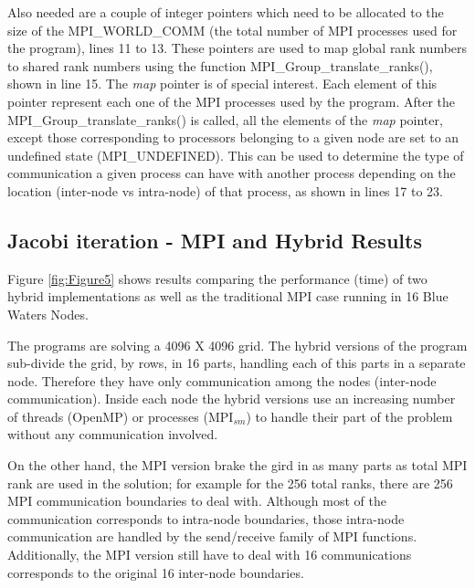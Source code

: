 Also needed are a couple of integer pointers which need to be allocated to the size of the MPI\_WORLD\_COMM (the total number of MPI processes used for the program), lines 11 to 13. These pointers are used to map global rank numbers to shared rank numbers using the function MPI\_Group\_translate\_ranks(), shown in line 15. The \emph{map} pointer is of special interest. Each element of this pointer represent each one of the MPI processes used by the program. After the MPI\_Group\_translate\_ranks() is called, all the elements of the \emph{map} pointer, except those corresponding to processors belonging to a given node are set to an undefined state (MPI\_UNDEFINED). This can be used to determine the type of communication a given process can have with another process depending on the location (inter-node vs intra-node) of that process, as shown in lines 17 to 23.


\subsection*{Jacobi iteration - MPI and Hybrid Results}



Figure \ref{fig:Figure5} shows results comparing the performance (time) of two hybrid implementations as well as the traditional MPI case running in 16 Blue Waters Nodes. 



The programs are solving a 4096 X 4096 grid. The hybrid versions of the program sub-divide the grid, by rows, in 16 parts, handling each of this parts in a separate node. Therefore they have only communication among the nodes (inter-node communication). Inside each node the hybrid versions use an increasing number of threads (OpenMP) or processes (MPI$_{sm}$) to handle their part of the problem without any communication involved.

On the other hand, the MPI version brake the gird in as many parts as total MPI rank are used in the solution; for example for the 256 total ranks, there are 256 MPI communication boundaries to deal with. Although most of the communication corresponds to intra-node boundaries, those intra-node communication are handled by the send/receive family of MPI functions. Additionally, the MPI version still have to deal with 16 communications corresponds to the original 16 inter-node boundaries.





